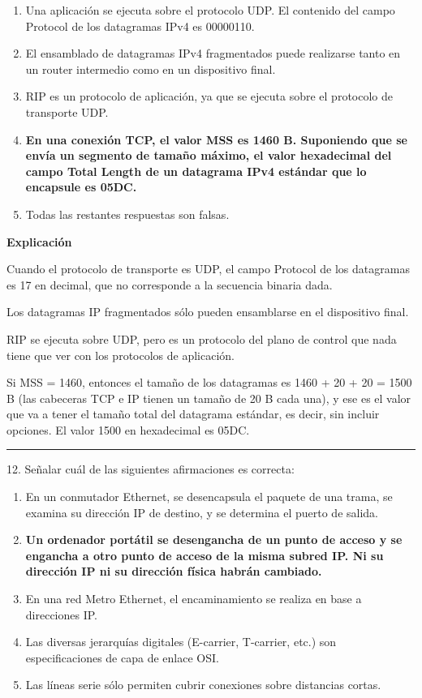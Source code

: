 \documentclass[10pt,a4paper]{article}
\begin{document}
\begin{enumerate}[label=\alph*]
    \item Una aplicación se ejecuta sobre el protocolo UDP. El contenido del campo Protocol de los datagramas IPv4 es 00000110.
    \item El ensamblado de datagramas IPv4 fragmentados puede realizarse tanto en un router intermedio como en un dispositivo final.
    \item RIP es un protocolo de aplicación, ya que se ejecuta sobre el protocolo de transporte UDP.
    \item \textbf{En una conexión TCP, el valor MSS es 1460 B. Suponiendo que se envía un segmento de tamaño máximo, el valor hexadecimal del campo Total Length de un datagrama IPv4 estándar que lo encapsule es 05DC.}
    \item Todas las restantes respuestas son falsas.
\end{enumerate}

\textbf{Explicación}

Cuando el protocolo de transporte es UDP, el campo Protocol de los datagramas es 17 en decimal, que no corresponde a la secuencia binaria dada.

Los datagramas IP fragmentados sólo pueden ensamblarse en el dispositivo final.

RIP se ejecuta sobre UDP, pero es un protocolo del plano de control que nada tiene que ver con los protocolos de aplicación.

Si MSS = 1460, entonces el tamaño de los datagramas es 1460 + 20 + 20 = 1500 B (las cabeceras TCP e IP tienen un tamaño de 20 B cada una), y ese es el valor que va a tener el tamaño total del datagrama estándar, es decir, sin incluir opciones. El valor 1500 en hexadecimal es 05DC.

\vspace{15pt} \hrule \vspace{15pt}




12.  Señalar cuál de las siguientes afirmaciones es correcta:

\begin{enumerate}[label=\alph*]
    \item En un conmutador Ethernet, se desencapsula el paquete de una trama, se examina su dirección IP de destino, y se determina el puerto de salida.
    \item \textbf{Un ordenador portátil se desengancha de un punto de acceso y se engancha a otro punto de acceso de la misma subred IP. Ni su dirección IP ni su dirección física habrán cambiado.}
    \item En una red Metro Ethernet, el encaminamiento se realiza en base a direcciones IP.
    \item Las diversas jerarquías digitales (E-carrier, T-carrier, etc.) son especificaciones de capa de enlace OSI.
    \item Las líneas serie sólo permiten cubrir conexiones sobre distancias cortas.
\end{enumerate}
\end{document}
